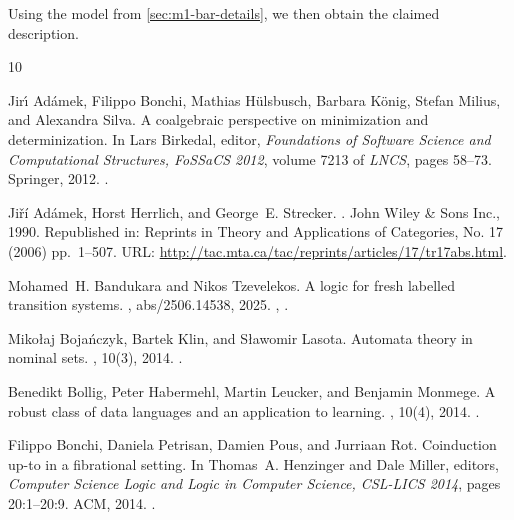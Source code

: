 \documentclass[11pt,a4paper]{amsart}
\newif\iffullversion
\theoremstyle{plain}
\numberwithin{equation}{section}
\newcommand{\+}[1]{\mathcal{#1}\xspace}
\theoremstyle{definition}
\begin{document}
Using the model from \cref{sec:m1-bar-details}, we then obtain the claimed description.

\fi %


\providecommand{\noopsort}[1]{}
\begin{thebibliography}{10}

Jir{\'{\i}} Ad{\'{a}}mek, Filippo Bonchi, Mathias H{\"{u}}lsbusch, Barbara
  K{\"{o}}nig, Stefan Milius, and Alexandra Silva.
\newblock A coalgebraic perspective on minimization and determinization.
\newblock In Lars Birkedal, editor, {\em Foundations of Software Science and
  Computational Structures, {FoSSaCS} 2012}, volume 7213 of {\em LNCS}, pages
  58--73. Springer, 2012.
\newblock \href {https://doi.org/10.1007/978-3-642-28729-9\_4}
  {}.

Ji{\v{r}\'i} Ad{\'a}mek, Horst Herrlich, and George~E. Strecker.
.
\newblock John Wiley \& Sons Inc., 1990.
\newblock Republished in: Reprints in Theory and Applications of Categories,
  No. 17 (2006) pp.~1--507.
\newblock URL: \url{http://tac.mta.ca/tac/reprints/articles/17/tr17abs.html}.

Mohamed~H. Bandukara and Nikos Tzevelekos.
\newblock A logic for fresh labelled transition systems.
, abs/2506.14538, 2025.
\newblock \href {https://arxiv.org/abs/2506.14538} {},
  \href {https://doi.org/10.48550/ARXIV.2506.14538}
  {}.

Miko{\l}aj Boja{\'n}czyk, Bartek Klin, and S{\l}awomir Lasota.
\newblock Automata theory in nominal sets.
, 10(3), 2014.
\newblock \href {https://doi.org/10.2168/LMCS-10(3:4)2014}
  {}.

Benedikt Bollig, Peter Habermehl, Martin Leucker, and Benjamin Monmege.
\newblock A robust class of data languages and an application to learning.
, 10(4), 2014.
\newblock \href {https://doi.org/10.2168/LMCS-10(4:19)2014}
  {}.

Filippo Bonchi, Daniela Petrisan, Damien Pous, and Jurriaan Rot.
\newblock Coinduction up-to in a fibrational setting.
\newblock In Thomas~A. Henzinger and Dale Miller, editors, {\em Computer
  Science Logic and Logic in Computer Science, {CSL-LICS} 2014}, pages
  20:1--20:9. {ACM}, 2014.
\newblock \href {https://doi.org/10.1145/2603088.2603149}
  {}.


\end{thebibliography}
\end{document}
